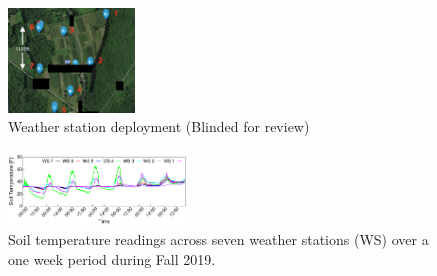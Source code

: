 \begin{figure}[t]
\centering
\includegraphics[width=0.3\textwidth]{./figures/orchardwatch.png}
\caption{Weather station deployment (Blinded for review)}
\label{fig:map}
\end{figure}

\begin{figure}[t]
\centering
\includegraphics[width=0.42\textwidth]{./figures/soil_temp.pdf}
\caption{Soil temperature readings across seven weather stations (WS) over a one week period during Fall 2019.}
\label{fig:soil-temp}
\end{figure}


